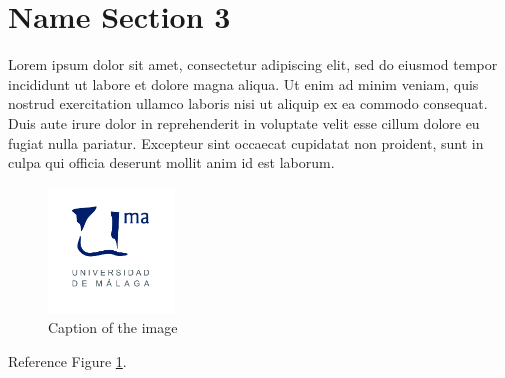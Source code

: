 \documentclass{llncs}
\begin{document}
\section{Name Section 3}

Lorem ipsum dolor sit amet, consectetur adipiscing elit, sed do eiusmod tempor incididunt ut labore et dolore magna aliqua. Ut enim ad minim veniam, quis nostrud exercitation ullamco laboris nisi ut aliquip ex ea commodo consequat. Duis aute irure dolor in reprehenderit in voluptate velit esse cillum dolore eu fugiat nulla pariatur. Excepteur sint occaecat cupidatat non proident, sunt in culpa qui officia deserunt mollit anim id est laborum.

\begin{figure}
	\centering
	\includegraphics[width=0.30\textwidth]{images/uma_logo.jpg}
	\caption{Caption of the image}
	\label{fig:example1}
\end{figure}

Reference Figure \ref{fig:example1}.
\end{document}
